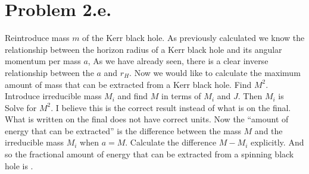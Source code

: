 \documentclass{article}
\begin{document}
\section*{Problem 2.e.}
Reintroduce mass $m$ of the Kerr black hole. As previously calculated we know the relationship between the horizon radius of a Kerr black hole and its angular momentum per mass $a$,
As we have already seen, there is a clear inverse relationship between the $a$ and $r_H$. Now we would like to calculate the maximum amount of mass that can be extracted from a Kerr black hole. Find $M^2$.
Introduce irreducible mass $M_i$ and find $M$ in terms of $M_i$ and $J$.
Then $M_i$ is
Solve for $M^2$.
I believe this is the correct result instead of what is on the final. What is written on the final
does not have correct units. Now the ``amount of energy that can be extracted'' is the difference between the mass $M$ and the irreducible mass $M_i$ when $a=M$. Calculate the difference $M-M_i$ explicitly.
And so the fractional amount of energy that can be extracted from a spinning black hole is . 
\end{document}
